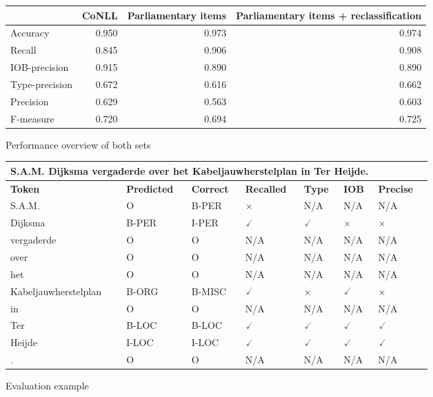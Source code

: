 \begin{figure}
\begin{tabular}{l||r|r|r|}
     & \multicolumn{1}{l|}{\textbf{CoNLL}} & \multicolumn{1}{l|}{\textbf{Parliamentary items}} & \multicolumn{1}{m{4cm}|}{\textbf{Parliamentary items + reclassification}} \\\hline \hline
Accuracy & 0.950 & 0.973 & 0.974 \\\hline
Recall & 0.845 & 0.906 & 0.908\\\hline 
IOB-precision & 0.915 & 0.890 & 0.890 \\\hline 
Type-precision & 0.672 & 0.616 & 0.662\\\hline 
Precision & 0.629 & 0.563 & 0.603\\\hline
F-measure & 0.720 & 0.694 & 0.725\\\hline
 \end{tabular}
\caption{Performance overview of both sets}
\label{fig:performance}
\end{figure}

\begin{figure}
\begin{tabular}{|l||l|l|l|l|l|l|l|}
\multicolumn{6}{l}{\large{S.A.M. Dijksma vergaderde over het Kabeljauwherstelplan in Ter Heijde.}} \\\hline
\multicolumn{1}{|l|}{\textbf{Token}} & \multicolumn{1}{l|}{\textbf{Predicted}} & \multicolumn{1}{l|}{\textbf{Correct}} & \textbf{Recalled} & \textbf{Type} & \textbf{IOB} & \textbf{Precise} \\\hline \hline
S.A.M. & O & B-PER & $\times$ & N/A & N/A & N/A \\\hline 
Dijksma & B-PER & I-PER & $\checked$ & $\checked$ & $\times$ & $\times$\\\hline 
vergaderde & O & O & N/A & N/A & N/A & N/A\\\hline 
over & O & O & N/A & N/A & N/A & N/A\\\hline  
het & O & O & N/A & N/A & N/A & N/A\\\hline 
Kabeljauwherstelplan & B-ORG & B-MISC & $\checked$ & $\times$ & $\checked$ & $\times$\\\hline 
in & O & O & N/A & N/A & N/A & N/A\\\hline 
Ter & B-LOC & B-LOC & $\checked$ & $\checked$ & $\checked$ & $\checked$\\\hline 
Heijde & I-LOC & I-LOC & $\checked$ & $\checked$ & $\checked$ & $\checked$\\\hline 
. & O & O & N/A & N/A & N/A & N/A\\\hline
\end{tabular}
\caption{Evaluation example}
\label{fig:eval_example}
\end{figure}

